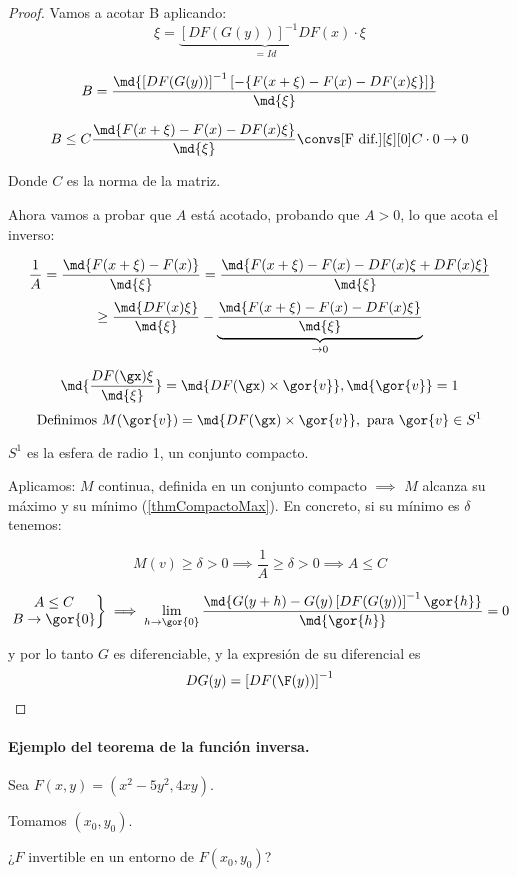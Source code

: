 \begin{proof}
  Vamos a acotar B aplicando:
  $$\xi = \underbrace{\left[DF(G(y))\right]^{-1}DF(x)}_{=Id} \cdot \xi$$

  $$B = \frac{\md{\left[DF(G(y))\right]^{-1} \left[ -\{F(x+\xi)-F(x) - DF(x)\xi\}\right]}}{\md{\xi}}$$
  
  $$B\leq C \frac{\md{F(x+\xi) - F(x) - DF(x)\xi}}{\md{\xi}} \convs[\text{F dif.}][\xi][0] C\cdot 0 \rightarrow 0$$
  
  Donde $C$ es la norma de la matriz. 

 
  Ahora vamos a probar que $A$ está acotado, probando que $A>0$, lo que acota el inverso:
  
  $$\frac{1}{A} = \frac{\md{F(x+\xi)-F(x)}}{\md{\xi}} = \frac{\md{F(x+\xi) - F(x) - DF(x)\xi + DF(x)\xi}}{\md{\xi}}$$
  $$\geq \frac{\md{DF(x)\xi}}{\md{\xi}} - \underbrace{\frac{\md{F(x+\xi) - F(x) - DF(x)\xi}}{\md{\xi}}}_{\rightarrow 0}$$
  
 
  $$\md{\frac{DF(\gx)\xi}{\md{\xi}}} = \md{DF(\gx)\times\gor{v}}, \md{\gor{v}} = 1$$
  $$\text{Definimos } M(\gor{v}) = \md{DF(\gx)\times\gor{v}}, \text{ para } \gor{v} \in S^1$$
  
  $S^1$ es la esfera de radio 1, un conjunto compacto.
  
  
  Aplicamos: $M$ continua, definida en un conjunto compacto $\implies$ $M$ alcanza su máximo y su mínimo (\ref{thmCompactoMax}). En concreto, si su mínimo es $\delta$ tenemos:
  
  $$ M(v)\geq \delta > 0 \implies \frac{1}{A}\geq \delta > 0 \implies A\leq C $$ 
  
  
  $$\left.\begin{matrix}A \leq C\\B \rightarrow \gor{0}\end{matrix}\right\} \implies \lim_{h \rightarrow \gor{0}}\frac{\md{G(y+h) - G(y) \left[DF(G(y))\right]^{-1} \gor{h}}}{\md{\gor{h}}} = 0$$
  
  y por lo tanto $G$ es diferenciable, y la expresión de su diferencial es \[ DG(y) = \left[DF(\F(y))\right]^{-1} \]
\end{proof}

\paragraph{Ejemplo del teorema de la función inversa.}
Sea $F(x,y) = (x^2-5y^2,4xy)$.

Tomamos $(x_0,y_0)$.

¿$F$ invertible en un entorno de $F(x_0,y_0)$?


